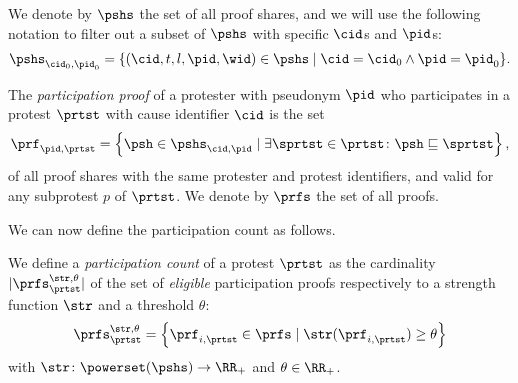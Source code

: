 We denote by \(\pshs\) the set of all proof shares,
and we will use the following notation to filter out a subset of \(\pshs\) with specific \(\cid\)s and \(\pid\)s:
\begin{multline*}
  \pshs_{\cid_0, \pid_0} = \{(\cid, t, l, \pid, \wid)\in \pshs\mid \cid = 
  \cid_0 \land \pid = \pid_0\}.
\end{multline*}

\begin{definition}%
  \label{DefParticipationProof}\label{DefParticipationProofs}
  The \emph{participation proof} of a protester with pseudonym \(\pid\) who participates in a protest \(\prtst\) with cause identifier \(\cid\) is the 
  set
  \begin{equation}
    \nonumber
    \prf_{\pid, \prtst} =
    \left\{ \psh \in \pshs_{\cid, \pid} \mid
      \exists \sprtst\in \prtst\colon \psh\sqsubseteq \sprtst \right\},
  \end{equation}
  of all proof shares with the same protester and protest identifiers, and valid for any subprotest $p$ of $\prtst$.
  We denote by \(\prfs\) the set of all proofs.
\end{definition}


We can now define the participation count as follows.
\begin{definition}%
  \label{DefParticipationCount}
  We define a \emph{participation count} of a protest \(\prtst\) as the cardinality 
  \(|\prfs_{\prtst}^{\str,\theta}|\) of the set of \emph{eligible} participation proofs respectively to a strength function $\str$ and a threshold $\theta$: \[
    \prfs_{\prtst}^{\str,\theta} = \left\{ \prf_{i,\prtst} \in \prfs \mid
      \str(\prf_{i,\prtst})\geq \theta \right\}
  \] with \(\str\colon \powerset(\pshs)\to \RR_+\) and  \(\theta \in \RR_+\).
\end{definition}

